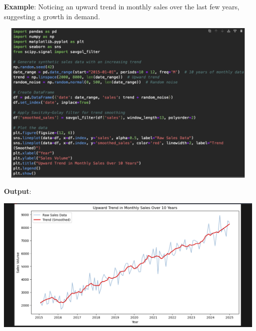 \documentclass{article}
\begin{document}
\begin{itemize}
\begin{itemize}
\textbf{Example}: Noticing an upward trend in monthly sales over the last few years, suggesting a growth in demand.

\includegraphics[width=14cm,height=8cm]{Trends.png}

\textbf{Output}:

\includegraphics[width=14cm,height=8
cm]{Trends_Output.png}
\end{itemize}
\end{itemize}
\newpage
\end{document}
